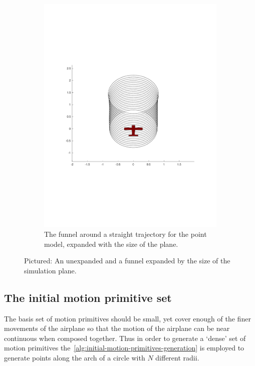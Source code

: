 \begin{figure}
\begin{subfigure}{0.5\textwidth}
    \includegraphics[trim={2cm 5cm 0cm 5cm},
    width=\textwidth]{figures/experiments/expanded-funnel-with-plane}
    \caption{The funnel around a straight trajectory for the point model,
      expanded with the size of the plane.}
  \end{subfigure}
  \caption{Pictured: An unexpanded and a funnel expanded by the size of the
    simulation plane.}
  \label{fig:expanded-and-unexpanded}
\end{figure}

\subsection{The initial motion primitive set}
\label{subsec:initial-motion-primitive}

The basis set of motion primitives should be small, yet cover enough of the
finer movements of the airplane so that the motion of the airplane can be near
continuous when composed together. Thus in order to generate a `dense' set of
motion primitives the~\cref{alg:initial-motion-primitives-generation} is
employed to generate points along the arch of a circle with \(N\) different
radii.


